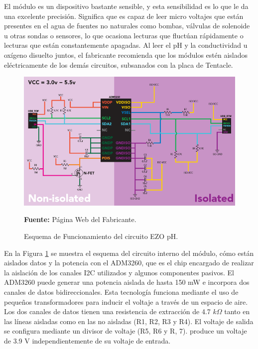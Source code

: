 El m\'odulo es un dispositivo bastante sensible, y esta sensibilidad es lo que le da una excelente precisión. 
Significa que es capaz de leer micro voltajes que est\'an presentes en el agua de fuentes no naturales como bombas, v\'alvulas de solenoide u otras sondas o sensores, lo que ocasiona lecturas que fluctúan rápidamente o lecturas que están constantemente apagadas.
Al leer el pH y la conductividad u oxígeno disuelto juntos, el fabricante recomienda que los m\'odulos estén aislados eléctricamente de los demás circuitos, subsanados con la placa de Tentacle.
\newline
\hfill
\begin{figure}[H]
    \centering
    \includegraphics[width=\textwidth]{Imagenes/2021/imag36.png}
    \caption[Esquema de Funcionamiento del circuito EZO pH]{Esquema de Funcionamiento del circuito EZO pH.}{\textbf{Fuente:} P\'agina Web del Fabricante\cite{ezoph}.}
    \label{fig:4.10}
\end{figure}

En la Figura \ref{fig:4.10} se muestra  el esquema del circuito interno del módulo, cómo están aislados datos y la potencia con el ADM3260, que es el chip encargado de realizar la aislación de los canales I2C utilizados y algunos componentes pasivos. El ADM3260 puede generar una potencia aislada de hasta 150 mW e incorpora dos canales de datos bidireccionales.
Esta tecnología funciona mediante el uso de pequeños transformadores para inducir el voltaje a través de un espacio de aire. Los dos canales de datos tienen una resistencia de extracción de 4.7 $k\Omega$ tanto en las líneas aisladas como en las no aisladas (R1, R2, R3 y R4). El voltaje de salida se configura mediante un divisor de voltaje (R5, R6 y R, 7). produce un voltaje de 3.9 V independientemente de su voltaje de entrada.

